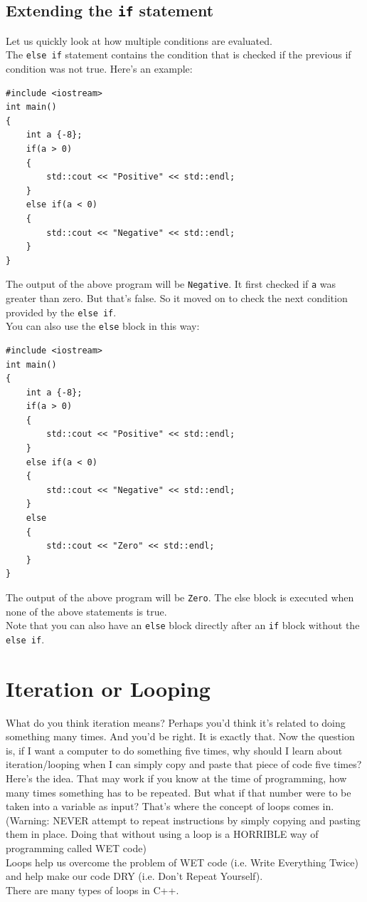 \documentclass[letterpaper, 12pt]{book}
\begin{document}
\subsection{Extending the \lstinline{if} statement}
Let us quickly look at how multiple conditions are evaluated.\\
The \lstinline{else if} statement contains the condition that is checked if the previous if condition was not true. Here's an example:\\
\begin{lstlisting}
#include <iostream>
int main()
{
	int a {-8};
	if(a > 0)
	{
		std::cout << "Positive" << std::endl;
	}
	else if(a < 0)
	{
		std::cout << "Negative" << std::endl;
	}
}
\end{lstlisting}
The output of the above program will be \lstinline{Negative}. It first checked if \lstinline{a} was greater than zero. But that's false. So it moved on to check the next condition provided by the \lstinline{else if}.\\
You can also use the \lstinline{else} block in this way:\\
\begin{lstlisting}
#include <iostream>
int main()
{
	int a {-8};
	if(a > 0)
	{
		std::cout << "Positive" << std::endl;
	}
	else if(a < 0)
	{
		std::cout << "Negative" << std::endl;
	}
	else
	{
		std::cout << "Zero" << std::endl;
	}
}
\end{lstlisting}
The output of the above program will be \lstinline{Zero}. The else block is executed when none of the above statements is true.\\
Note that you can also have an \lstinline{else} block directly after an \lstinline{if} block without the \lstinline{else if}.
\section{Iteration or Looping}
What do you think iteration means? Perhaps you'd think it's related to doing something many times. And you'd be right. It is exactly that. Now the question is, if I want a computer to do something five times, why should I learn about iteration/looping when I can simply copy and paste that piece of code five times?\\
Here's the idea. That may work if you know at the time of programming, how many times something has to be repeated. But what if that number were to be taken into a variable as input? That's where the concept of loops comes in.\\ 
{\color{red}(Warning: NEVER attempt to repeat instructions by simply copying and pasting them in place. Doing that without using a loop is a HORRIBLE way of programming called WET code)}\\
Loops help us overcome the problem of WET code (i.e. Write Everything Twice) and help make our code DRY (i.e. Don't Repeat Yourself).\\
There are many types of loops in C++.
\end{document}
